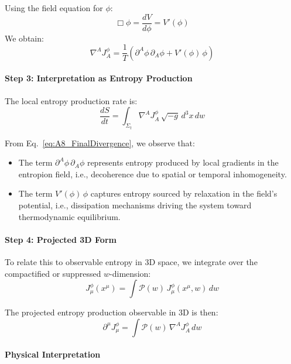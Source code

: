 \documentclass[12pt]{article}
\begin{document}
Using the field equation for \(\phi\):
\begin{equation}
\Box \phi = \frac{dV}{d\phi} = V'(\phi)
\end{equation}
We obtain:
\begin{equation}
\nabla^A J_A^\phi = \frac{1}{T} \left( \partial^A \phi\, \partial_A \phi + V'(\phi)\, \phi \right)
\label{eq:A8_FinalDivergence}
\end{equation}

\paragraph{Step 3: Interpretation as Entropy Production}

The local entropy production rate is:
\begin{equation}
\frac{dS}{dt} = \int_{\Sigma_t} \nabla^A J_A^\phi\, \sqrt{-g}\, d^3x\, dw
\end{equation}

From Eq.~\eqref{eq:A8_FinalDivergence}, we observe that:
\begin{itemize}
  \item The term \(\partial^A \phi\, \partial_A \phi\) represents entropy produced by local gradients in the entropion field, i.e., decoherence due to spatial or temporal inhomogeneity.
  \item The term \(V'(\phi)\, \phi\) captures entropy sourced by relaxation in the field's potential, i.e., dissipation mechanisms driving the system toward thermodynamic equilibrium.
\end{itemize}

\paragraph{Step 4: Projected 3D Form}

To relate this to observable entropy in 3D space, we integrate over the compactified or suppressed \(w\)-dimension:
\begin{equation}
J^\phi_\mu(x^\mu) = \int \mathcal{P}(w)\, J^\phi_\mu(x^\mu, w)\, dw
\end{equation}

The projected entropy production observable in 3D is then:
\begin{equation}
\partial^\mu J^\phi_\mu = \int \mathcal{P}(w)\, \nabla^A J^\phi_A\, dw
\label{eq:A8_3DProjection}
\end{equation}

\paragraph{Physical Interpretation}
\end{document}
